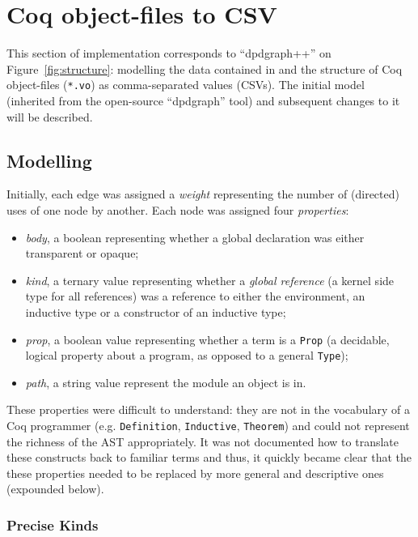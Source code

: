 \section{Coq object-files to CSV}

This section of implementation corresponds to ``dpdgraph++'' on
Figure~\ref{fig:structure}: modelling the data contained in and the structure
of Coq object-files (\texttt{*.vo}) as comma-separated values (CSVs). The
initial model (inherited from the open-source ``dpdgraph'' tool) and subsequent
changes to it will be described.

\subsection{Modelling}

Initially, each edge was assigned a \emph{weight} representing the number of
(directed) uses of one node by another. Each node was assigned four
\emph{properties}: 

\begin{itemize}
  \item \emph{body}, a boolean representing whether a global declaration was
    either transparent or opaque;
  
  \item \emph{kind}, a ternary value representing whether a \emph{global
    reference} (a kernel side type for all references) was a reference to either
    the environment, an inductive type or a constructor of an inductive type;

  \item \emph{prop}, a boolean value representing whether a term is a \texttt{Prop}
    (a decidable, logical property about a program, as opposed to a
    general \texttt{Type});

  \item \emph{path}, a string value represent the module an object is in.
\end{itemize}

These properties were difficult to understand: they are not in the
vocabulary of a Coq programmer (e.g. \texttt{Definition}, \texttt{Inductive},
\texttt{Theorem}) and could not represent the richness of the
AST appropriately. It was not documented how to translate these constructs back
to familiar terms and thus, it quickly became clear that the these properties
needed to be replaced by more general and descriptive ones (expounded below).

\subsubsection{Precise Kinds}

